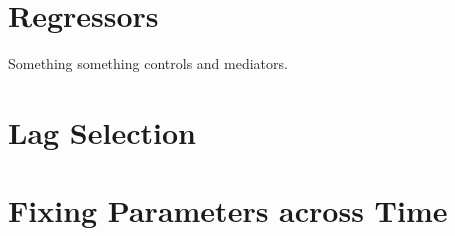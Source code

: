 \section{Regressors}
\label{sec:modelling:regressors}
Something something controls and mediators.

\section{Lag Selection}
\label{sec:modelling:lags}

\section{Fixing Parameters across Time}
\label{sec:modelling:parameter_fixing}
